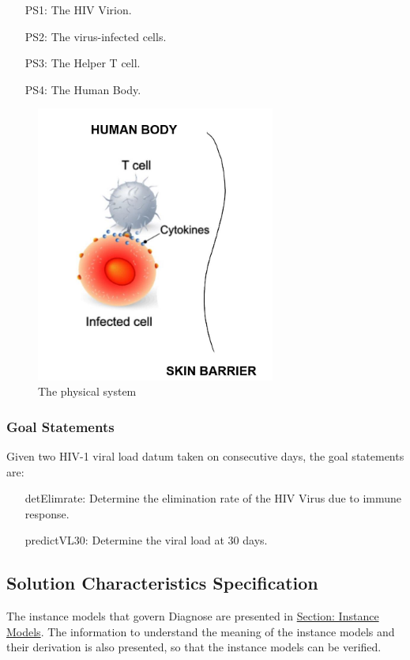 \documentclass[12pt]{article}
\begin{document}
\begin{itemize}
\item[PS1:]{The HIV Virion.}
\item[PS2:]{The virus-infected cells.}
\item[PS3:]{The Helper T cell.}
\item[PS4:]{The Human Body.}
\end{itemize}
\begin{figure}
\begin{center}
\includegraphics[width=0.7\textwidth]{../../../datafiles/Diagnose/Virusinbody.JPG}
\caption{The physical system}
\label{Figure:Virus}
\end{center}
\end{figure}
\subsubsection{Goal Statements}
\label{Sec:GoalStmt}
Given two HIV-1 viral load datum taken on consecutive days, the goal statements are:

\begin{itemize}
\item[detElimrate:\phantomsection\label{detElimrate}]{Determine the elimination rate of the HIV Virus due to immune response.}
\item[predictVL30:\phantomsection\label{predictVL30}]{Determine the viral load at 30 days.}
\end{itemize}
\subsection{Solution Characteristics Specification}
\label{Sec:SolCharSpec}
The instance models that govern Diagnose are presented in \hyperref[Sec:IMs]{Section: Instance Models}. The information to understand the meaning of the instance models and their derivation is also presented, so that the instance models can be verified.
\end{document}
